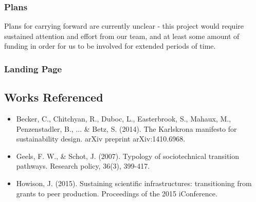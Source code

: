 \subsubsection{Plans}

Plans for carrying forward are currently unclear - this project would require sustained attention and effort from our team, and at least some amount of funding in order for us to be involved for extended periods of time.

\subsubsection{Landing Page}


\subsection{Works Referenced}


\begin{itemize}
\item Becker, C., Chitchyan, R., Duboc, L., Easterbrook, S., Mahaux, M., Penzenstadler, B., ... \& Betz, S. (2014). The Karlskrona manifesto for sustainability design. arXiv preprint arXiv:1410.6968.
\item Geels, F. W., \& Schot, J. (2007). Typology of sociotechnical transition pathways. Research policy, 36(3), 399-417.
\item Howison, J. (2015). Sustaining scientific infrastructures: transitioning from grants to peer production. Proceedings of the 2015 iConference. 
\end{itemize}